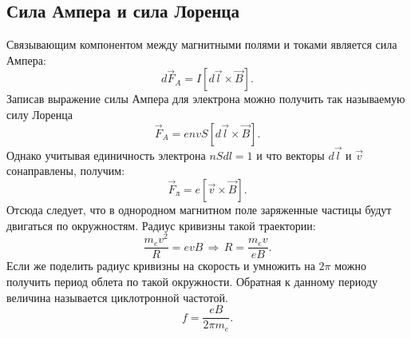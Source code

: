 \subsection{Сила Ампера и сила Лоренца}
Связывающим компонентом между магнитными полями и токами является сила Ампера:
\begin{equation}
	d\vec{F}_A = I[d\vec{l}\times\vec{B}].
\end{equation}
Записав выражение силы Ампера для электрона можно получить так называемую силу Лоренца
\begin{equation*}
	\vec{F}_A = envS[d\vec{l}\times\vec{B}].
\end{equation*}
Однако учитывая единичность электрона $nSdl=1$ и что векторы $d\vec{l}$ и $\vec{v}$ сонаправлены, получим:
\begin{equation}
	\vec{F}_{\text{л}} = e[\vec{v}\times\vec{B}].
\end{equation}
Отсюда следует, что в однородном магнитном поле заряженные частицы будут двигаться по окружностям. Радиус кривизны такой траектории:
\begin{equation}
	\frac{m_e v^2}{R} = evB \, \Rightarrow \, R = \frac{m_e v}{eB}.
\end{equation}
Если же поделить радиус кривизны на скорость и умножить на $2\pi$ можно получить период облета по такой окружности. Обратная к данному периоду величина называется циклотронной частотой.
\begin{equation}
	f = \frac{eB}{2\pi m_e}.
\end{equation}